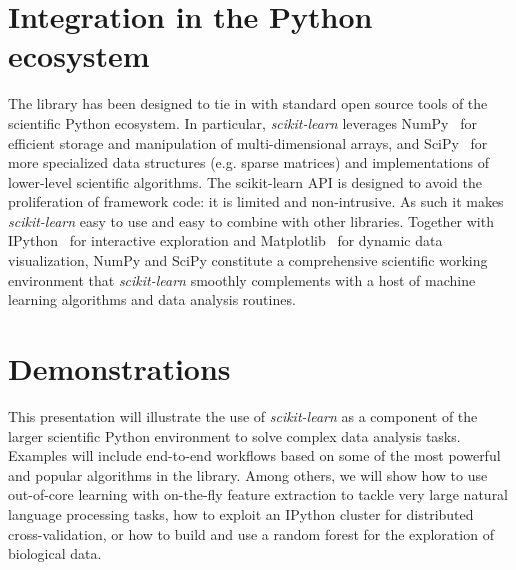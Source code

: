 \documentclass{article}
\newcommand{\sklearn}{\textit{scikit-learn}\xspace}
\DeclareRobustCommand{\VAN}[3]{#2}
\begin{document}
\section*{Integration in the Python ecosystem}

The library has been designed to tie in with standard  open source tools of the
scientific Python ecosystem. In particular, \sklearn leverages
NumPy~\citep{vanderwalt2011} for efficient storage and manipulation of
multi-dimensional arrays, and SciPy~\citep{oliphant2007python} for more specialized
data structures  (e.g. sparse matrices) and implementations of lower-level
scientific algorithms. The scikit-learn API is designed to avoid the
proliferation of framework code: it is
limited and non-intrusive. As such it makes \sklearn easy to use and easy to
combine with other libraries. Together with IPython~\citep{perez2007ipython}
for interactive exploration and Matplotlib~\citep{hunter2007matplotlib} for
dynamic data visualization, NumPy and SciPy constitute a comprehensive
scientific working environment that \sklearn smoothly complements with a
host of machine learning algorithms and data analysis routines.


\section*{Demonstrations}

This presentation will illustrate the use of \sklearn as a component of the
larger scientific Python environment to solve complex data analysis tasks.
Examples will include end-to-end workflows based on some of the most powerful
and popular algorithms in the library. Among others, we will show how to use
out-of-core learning with on-the-fly feature extraction to 
tackle very large natural language processing tasks, how to
exploit an IPython cluster for distributed cross-validation, or how to build and
use a random forest for the exploration of biological data.


{\scriptsize

\DeclareRobustCommand{\VAN}[3]{#3}
\setlength{\bibsep}{1mm}

}
\end{document}
